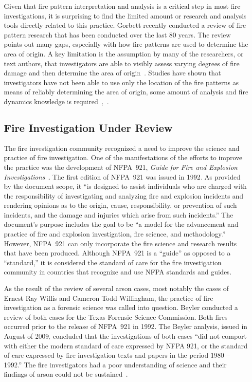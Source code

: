 \documentclass[twoside]{uocthesis}
\begin{document}
Given that fire pattern interpretation and analysis is a critical step in most fire investigations, it is surprising to find the limited amount or research and analysis tools directly related to this practice.  Gorbett recently conducted a review of fire pattern research that has been conducted over the last 80 years. The review points out many gaps, especially with how fire patterns are used to determine the area of origin.  A key limitation is the assumption by many of the researchers, or text authors, that investigators are able to visibly assess varying degrees of fire damage and then determine the area of origin~\cite{Gorbett_2015}. Studies have shown that investigators have not been able to use only the location of the fire patterns as means of reliably determining the area of origin, some amount of analysis and fire dynamics knowledge is required~\cite{Carmen_2008},~\cite{Tinsley_2013}.      


\subsection{Fire Investigation Under Review}
The fire investigation community recognized a need to improve the science and practice of fire investigation.  One of the manifestations of the efforts to improve the practice was the development of NFPA~921, {\em Guide for Fire and Explosion Investigations}~\cite{NFPA:921}.  The first edition of NFPA~921 was issued in 1992.  As provided by the document scope, it ``is designed to assist individuals who are charged with the responsibility of investigating and analyzing fire and explosion incidents and rendering opinions as to the origin, cause, responsibility, or prevention of such incidents, and the damage and injuries which arise from such incidents.'' The document’s purpose includes the goal to be ``a model for the advancement and practice of fire and explosion investigation, fire science, and methodology.'' However, NFPA~921 can only incorporate the fire science and research results that have been produced.  Although NFPA~921 is a ``guide'' as opposed to a ``standard,'' it is considered the standard of care for the fire investigation community in countries that recognize and use NFPA standards and guides.

As the result of the review of several arson cases, most notably the cases of Ernest Ray Willis and Cameron Todd Willingham, the practice of fire investigation as a forensic science was called into question.  Beyler conducted a review of both cases for the Texas Forensic Science Commission.  Both fires occurred prior to the release of NFPA~921 in 1992.  The Beyler analysis, issued in August of 2009, concluded that the investigations of both cases ``did not comport with either the modern standard of care expressed by NFPA 921, or the standard of care expressed by fire investigation texts and papers in the period 1980 – 1992.'' The fire investigators had a poor understanding of science and their findings of arson could not be sustained~\cite{Beyler:2009}.
\end{document}
